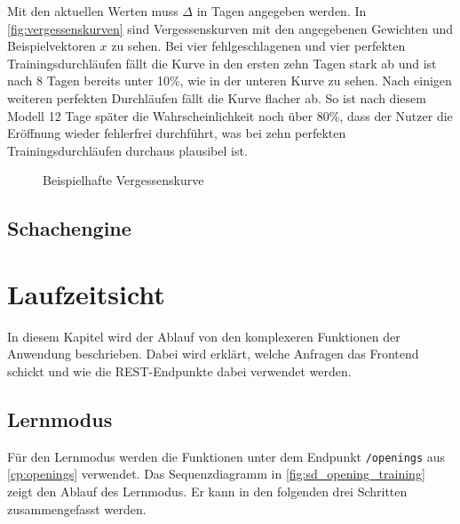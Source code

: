 Mit den aktuellen Werten muss $\Delta$ in Tagen angegeben werden. In \autoref{fig:vergessenskurven} sind Vergessenskurven mit den angegebenen Gewichten und Beispielvektoren $x$ zu sehen. Bei vier fehlgeschlagenen und vier perfekten Trainingsdurchläufen fällt die Kurve in den ersten zehn Tagen stark ab und ist nach 8 Tagen bereits unter 10\%, wie in der unteren Kurve zu sehen. Nach einigen weiteren perfekten Durchläufen fällt die Kurve flacher ab. So ist nach diesem Modell 12 Tage später die Wahrscheinlichkeit noch über 80\%, dass der Nutzer die Eröffnung wieder fehlerfrei durchführt, was bei zehn perfekten Trainingsdurchläufen durchaus plausibel ist.

\begin{figure}
    
    \caption{Beispielhafte Vergessenskurve}
    \label{fig:vergessenskurven}
\end{figure}

\subsection{Schachengine}

\section{Laufzeitsicht}

In diesem Kapitel wird der Ablauf von den komplexeren Funktionen der Anwendung beschrieben. Dabei wird erklärt, welche Anfragen das Frontend schickt und wie die REST-Endpunkte dabei verwendet werden.

\subsection{Lernmodus}
Für den Lernmodus werden die Funktionen unter dem Endpunkt \lstinline{/openings} aus \autoref{cp:openings} verwendet.
Das Sequenzdiagramm in \autoref{fig:sd_opening_training} zeigt den Ablauf des Lernmodus. Er kann in den folgenden drei Schritten zusammengefasst werden.

